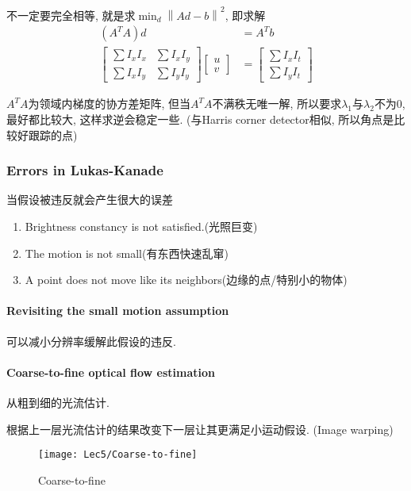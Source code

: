 不一定要完全相等, 就是求$\min_d \left\| Ad-b \right\|^2$, 即求解
\begin{align*}
    (A^TA)d&=A^Tb\\
    \begin{bmatrix}
        \sum I_xI_x & \sum I_xI_y\\
        \sum I_xI_y & \sum I_yI_y
    \end{bmatrix}\begin{bmatrix}
        u\\v
    \end{bmatrix}&=\begin{bmatrix}
        \sum I_xI_t\\
        \sum I_yI_t
    \end{bmatrix}
\end{align*}

$A^TA$为领域内梯度的协方差矩阵, 但当$A^TA$不满秩无唯一解, 所以要求$\lambda_1$与$\lambda_2$不为0, 最好都比较大, 这样求逆会稳定一些. (与Harris corner detector相似, 所以角点是比较好跟踪的点)

\subsubsection{Errors in Lukas-Kanade}
当假设被违反就会产生很大的误差
\begin{enumerate}
    \item Brightness constancy is not satisfied.(光照巨变)
    \item The motion is not small(有东西快速乱窜)
    \item A point does not move like its neighbors(边缘的点/特别小的物体)
\end{enumerate}

\paragraph{Revisiting the small motion assumption}
可以减小分辨率缓解此假设的违反.

\paragraph{Coarse-to-fine optical flow estimation}从粗到细的光流估计.

根据上一层光流估计的结果改变下一层让其更满足小运动假设. (Image warping)
\begin{figure}[H]
    \centering
    \texttt{[image: Lec5/Coarse-to-fine]}
    \caption{Coarse-to-fine}
\end{figure}


